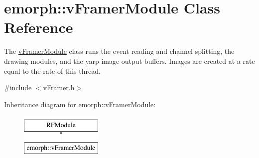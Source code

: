 \hypertarget{classemorph_1_1vFramerModule}{\section{emorph\-:\-:v\-Framer\-Module Class Reference}
\label{classemorph_1_1vFramerModule}
}


The \hyperlink{classemorph_1_1vFramerModule}{v\-Framer\-Module} class runs the event reading and channel splitting, the drawing modules, and the yarp image output buffers. Images are created at a rate equal to the rate of this thread.  




{\ttfamily \#include $<$v\-Framer.\-h$>$}

Inheritance diagram for emorph\-:\-:v\-Framer\-Module\-:\begin{figure}[H]
\begin{center}
\leavevmode
\includegraphics[height=2.000000cm]{classemorph_1_1vFramerModule}
\end{center}
\end{figure}
